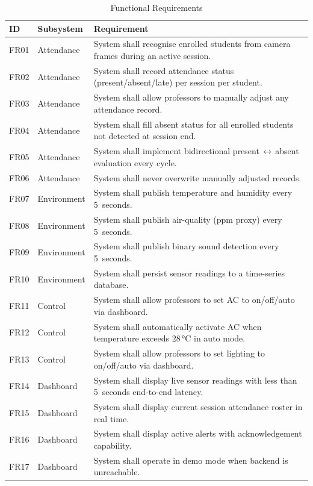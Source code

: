 \begin{table}[H]
\centering
\caption{Functional Requirements}
\label{tab:func_req}
\begin{tabular}{@{}p{0.7cm}p{2.2cm}p{4.6cm}@{}}
\toprule
\textbf{ID} & \textbf{Subsystem} & \textbf{Requirement} \\
\midrule
FR01 & Attendance  & System shall recognise enrolled students from camera frames during an active session. \\
FR02 & Attendance  & System shall record attendance status (present/absent/late) per session per student. \\
FR03 & Attendance  & System shall allow professors to manually adjust any attendance record. \\
FR04 & Attendance  & System shall fill absent status for all enrolled students not detected at session end. \\
FR05 & Attendance  & System shall implement bidirectional present\,$\leftrightarrow$\,absent evaluation every cycle. \\
FR06 & Attendance  & System shall never overwrite manually adjusted records. \\
\midrule
FR07 & Environment & System shall publish temperature and humidity every 5~seconds. \\
FR08 & Environment & System shall publish air-quality (ppm proxy) every 5~seconds. \\
FR09 & Environment & System shall publish binary sound detection every 5~seconds. \\
FR10 & Environment & System shall persist sensor readings to a time-series database. \\
\midrule
FR11 & Control     & System shall allow professors to set AC to on/off/auto via dashboard. \\
FR12 & Control     & System shall automatically activate AC when temperature exceeds 28\,°C in auto mode. \\
FR13 & Control     & System shall allow professors to set lighting to on/off/auto via dashboard. \\
\midrule
FR14 & Dashboard   & System shall display live sensor readings with less than 5~seconds end-to-end latency. \\
FR15 & Dashboard   & System shall display current session attendance roster in real time. \\
FR16 & Dashboard   & System shall display active alerts with acknowledgement capability. \\
FR17 & Dashboard   & System shall operate in demo mode when backend is unreachable. \\

\end{tabular}
\end{table}
